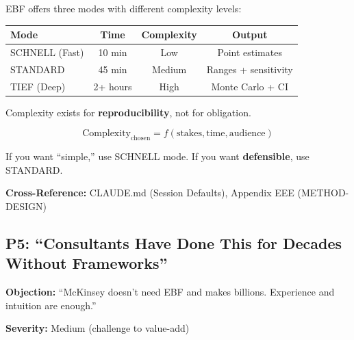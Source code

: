 \begin{axiom}
EBF offers three modes with different complexity levels:

\begin{center}
\begin{tabular}{lccc}
\textbf{Mode} & \textbf{Time} & \textbf{Complexity} & \textbf{Output} \\
\midrule
SCHNELL (Fast) & 10 min & Low & Point estimates \\
STANDARD & 45 min & Medium & Ranges + sensitivity \\
TIEF (Deep) & 2+ hours & High & Monte Carlo + CI \\
\end{tabular}
\end{center}

Complexity exists for \textbf{reproducibility}, not for obligation.

\begin{equation}
\text{Complexity}_{\text{chosen}} = f(\text{stakes}, \text{time}, \text{audience})
\end{equation}

If you want ``simple,'' use SCHNELL mode. If you want \textbf{defensible}, use STANDARD.
\end{axiom}

\textbf{Cross-Reference:} CLAUDE.md (Session Defaults), Appendix EEE (METHOD-DESIGN)

\subsection{P5: ``Consultants Have Done This for Decades Without Frameworks''}
\label{sec:da-p5}

\begin{tcolorbox}[colback=gray!5!white, colframe=gray!75!black]
\textbf{Objection:} ``McKinsey doesn't need EBF and makes billions.
Experience and intuition are enough.''

\textbf{Severity:} Medium (challenge to value-add)
\end{tcolorbox}

